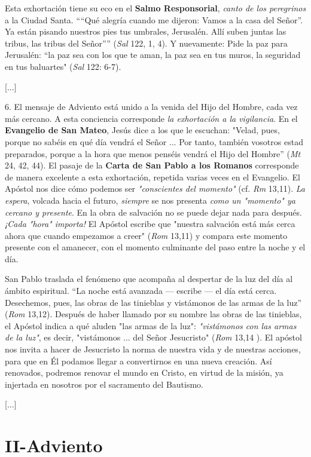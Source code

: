 Esta exhortación tiene su eco en el \textbf{Salmo Responsorial}, \emph{canto de los peregrinos} a la Ciudad Santa. ````Qué alegría cuando me dijeron: Vamos a la casa del Señor''. Ya están pisando nuestros pies tus umbrales, Jerusalén. Allí suben juntas las tribus, las tribus del Señor'''' (\emph{Sal} 122, 1, 4). Y nuevamente: Pide la paz para Jerusalén: ``la paz sea con los que te aman, la paz sea en tus muros, la seguridad en tus baluartes" (\emph{Sal} 122: 6-7).

{[}...{]}

6. El mensaje de Adviento está unido a la venida del Hijo del Hombre, cada vez más cercano. A esta conciencia corresponde \emph{la exhortación a la vigilancia}. En el \textbf{Evangelio de San Mateo}, Jesús dice a los que le escuchan: "Velad, pues, porque no sabéis en qué día vendrá el Señor ... Por tanto, también vosotros estad preparados, porque a la hora que menos penséis vendrá el Hijo del Hombre'' (\emph{Mt} 24, 42, 44). El pasaje de la \textbf{Carta de San Pablo a los Romanos} corresponde de manera excelente a esta exhortación, repetida varias veces en el Evangelio. El Apóstol nos dice cómo podemos ser \emph{"conscientes del momento"} (cf. \emph{Rm} 13,11). \emph{La espera}, volcada hacia el futuro, \emph{siempre} se nos presenta \emph{como un "momento" ya cercano y presente}. En la obra de salvación no se puede dejar nada para después. \emph{¡Cada "hora" importa!} El Apóstol escribe que "nuestra salvación está más cerca ahora que cuando empezamos a creer" (\emph{Rom} 13,11) y compara este momento presente con el amanecer, con el momento culminante del paso entre la noche y el día.

San Pablo traslada el fenómeno que acompaña al despertar de la luz del día al ámbito espiritual. ``La noche está avanzada --- escribe --- el día está cerca. Desechemos, pues, las obras de las tinieblas y vistámonos de las armas de la luz'' (\emph{Rom} 13,12). Después de haber llamado por su nombre las obras de las tinieblas, el Apóstol indica a qué aluden "las armas de la luz": \emph{"vistámonos con las armas de la luz"}, es decir, "vistámonos ... del Señor Jesucristo" (\emph{Rom} 13,14 ). El apóstol nos invita a hacer de Jesucristo la norma de nuestra vida y de nuestras acciones, para que en Él podamos llegar a convertirnos en una nueva creación. Así renovados, podremos renovar el mundo en Cristo, en virtud de la misión, ya injertada en nosotros por el sacramento del Bautismo.

{[}...{]}

\chapter{II-Adviento}

